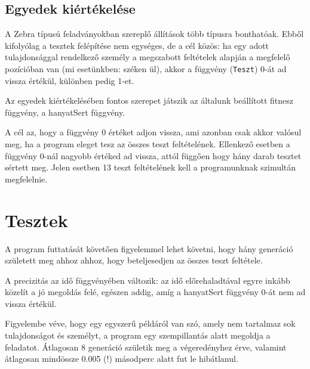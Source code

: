 \documentclass[12ppt,a4paper,oneside]{report}
\begin{document}
    \section{Egyedek kiértékelése} %
	A Zebra típusú feladványokban szereplő állítások több típusra bonthatóak. Ebből kifolyólag a tesztek felépítése nem egységes, de a cél közös: ha egy adott tulajdonsággal rendelkező személy a megszabott feltételek alapján a megfelelő pozícióban van (mi esetünkben: széken ül), akkor a függvény (\texttt{Teszt}) 0-át ad vissza értékül, különben pedig 1-et.

	Az egyedek kiértékelésében fontos szerepet játszik az általunk beállított fitnesz függvény, a hanyatSert függvény.


	{A cél az, hogy a függvény 0 értéket adjon vissza, ami azonban csak akkor valósul meg, ha a program eleget tesz az összes teszt feltételének.}
	Ellenkező esetben a függvény 0-nál nagyobb értéked ad vissza, attól függően hogy hány darab tesztet sértett meg.
	Jelen esetben 13 teszt feltételének kell a programunknak szimultán megfelelnie.

	

\chapter{Tesztek} %
	A program futtatását követően figyelemmel lehet követni, hogy hány generáció született meg ahhoz ahhoz, hogy beteljesedjen az összes teszt feltétele.


	A precizitás az idő függvényében változik: az idő előrehaladtával egyre inkább közelít a jó megoldás felé, egészen addig, amíg a hanyatSert függvény 0-át nem ad vissza értékül.


	Figyelembe véve, hogy egy egyszerű példáról van szó, amely nem tartalmaz sok tulajdonságot és személyt, a program egy szempillantás alatt megoldja a feladatot.
	Átlagosan 8 generáció születik meg a végeredényhez érve, valamint átlagosan mindössze 0.005 (!) másodperc alatt fut le hibátlanul.
\end{document}
